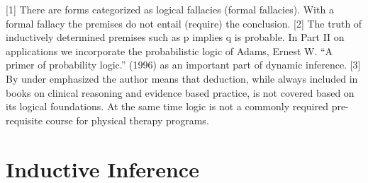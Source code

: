 \documentclass[
]{book}
\begin{document}
{[}1{]} There are forms categorized as logical fallacies (formal fallacies). With a formal fallacy the premises do not entail (require) the conclusion.
{[}2{]} The truth of inductively determined premises such as p implies q is probable. In Part II on applications we incorporate the probabilistic logic of Adams, Ernest W. ``A primer of probability logic.'' (1996) as an important part of dynamic inference.
{[}3{]} By under emphasized the author means that deduction, while always included in books on clinical reasoning and evidence based practice, is not covered based on its logical foundations. At the same time logic is not a commonly required pre-requisite course for physical therapy programs.

\hypertarget{inductive-inference}{%
\section{Inductive Inference}\label{inductive-inference}}
\end{document}
